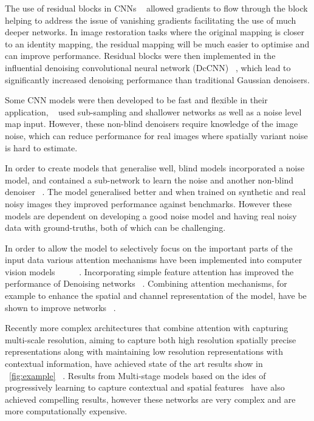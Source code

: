 \documentclass[project-plan]{report-template}
\begin{document}
The use of residual blocks in CNNs ~\cite{he2015DeepRL} allowed gradients to flow through the block helping to address the issue of vanishing gradients facilitating the use of much deeper networks. In image restoration tasks where the original mapping is closer to an identity mapping, the residual mapping will be much easier to optimise and can improve performance. Residual blocks were then implemented in the influential denoising convolutional neural network (DcCNN) ~\cite{zhang2017beyond}, which lead to significantly increased denoising performance than traditional Gaussian denoisers. 

Some CNN models were then developed to be fast and flexible in their application, ~\cite{zhang2018ffdnet} used sub-sampling and shallower networks as well as a noise level map input. However, these non-blind denoisers require knowledge of the image noise, which can reduce performance for real images where spatially variant noise is hard to estimate.  

In order to create models that generalise well, blind models incorporated a noise model, and contained a sub-network to learn the noise and another non-blind denoiser ~\cite{Guo2019Cbdnet}. The model generalised better and when trained on synthetic and real noisy images they improved performance against benchmarks. However these models are dependent on developing a good noise model and having real noisy data with ground-truths, both of which can be challenging.

In order to allow the model to selectively focus on the important parts of the input data various attention mechanisms have been implemented into computer vision models ~\cite{wang2017residual}~\cite{hu2018senet}~\cite{woo2018cbam}~\cite{wang2020eca}~\cite{hou2021coordinate}. Incorporating simple feature attention has improved the performance of Denoising networks ~\cite{anwar2019rid}. Combining attention mechanisms, for example to enhance the spatial and channel representation of the model, have be shown to improve networks ~\cite{cai2023cbamdncnn}.

Recently more complex architectures that combine attention with capturing multi-scale resolution, aiming to capture both high resolution spatially precise representations along with maintaining low resolution representations with contextual information, have achieved state of the art results show in ~\ref{fig:example} ~\cite{zamir2020MIRNet}. Results from Multi-stage models based on the ides of progressively learning to capture contextual and spatial features~\cite{zamir2021MPRNet} have also achieved compelling results, however these networks are very complex and are more computationally expensive.
\end{document}
